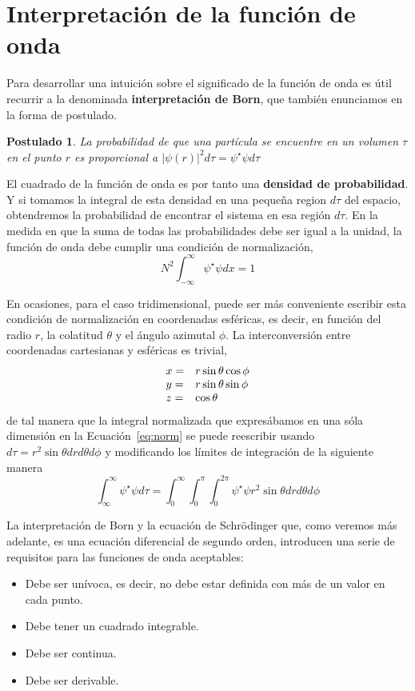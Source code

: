 \documentclass{tufte-handout}
\newtheorem{theorem}{Postulado}
\begin{document}
\section{Interpretación de la función de onda}
Para desarrollar una intuición sobre el significado
de la función de onda es útil recurrir a la 
denominada \textbf{interpretación de 
Born}, que también enunciamos en la forma de 
postulado.
\begin{theorem} 
La probabilidad de que una partícula se encuentre en 
un volumen $\tau$ en el punto $r$ es proporcional
a $|\psi(r)|^2d\tau=\psi^\star \psi d\tau$
\end{theorem}
El cuadrado de la función de onda es por tanto una
\textbf{densidad de probabilidad}. Y si tomamos la
integral de esta densidad en una pequeña region 
$d\tau$ del espacio, obtendremos la probabilidad de
encontrar el sistema en esa región $d\tau$. En la 
medida en que la suma de todas las probabilidades
debe ser igual a la unidad, la función de onda debe 
cumplir una condición de normalización,
\begin{equation}
    N^2\int_{-\infty}^\infty\psi^\star\psi dx=1
    \label{eq:norm}
\end{equation}

En ocasiones, para el caso tridimensional, puede 
ser más conveniente escribir esta condición de 
normalización en coordenadas esféricas, es decir,
en función del radio $r$, la colatitud $\theta$
y el ángulo azimutal $\phi$. La interconversión
entre coordenadas cartesianas y esféricas es 
trivial, 
\begin{equation}
  \begin{array}{@{}ll@{}}
    x = & r\sin\theta\cos\phi \\
    y = & r\sin\theta\sin\phi \\
    z = & \cos \theta
  \end{array}
\end{equation}
de tal manera que la integral normalizada que 
expresábamos en una sóla dimensión en la 
Ecuación~\ref{eq:norm} se puede reescribir usando
$d\tau=r^2\sin\theta drd\theta d\phi$ y modificando
los límites de integración de la siguiente manera
\begin{equation}
    \int_\infty^\infty\psi^\star\psi d\tau=
    \int_0^\infty\int_0^\pi\int_0^{2\pi}\psi^\star\psi r^2\sin\theta drd\theta d\phi
\end{equation}

La interpretación de Born y la ecuación de Schrödinger
que, como veremos más adelante, es una ecuación
diferencial de segundo orden, introducen una serie de
requisitos para las funciones de onda aceptables:
\begin{itemize}
    \item Debe ser unívoca, es decir, no debe 
    estar definida con más de un valor en cada punto.
    \item Debe tener un cuadrado integrable.
    \item Debe ser continua.
    \item Debe ser derivable.
\end{itemize}
\end{document}
